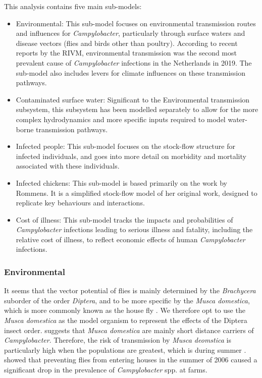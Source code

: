This analysis contains five main sub-models:
\begin{itemize}
    \item Environmental: This sub-model focuses on environmental transmission routes and influences for \textit{Campylobacter}, particularly through surface waters and disease vectors (flies and birds other than poultry). According to recent reports by the RIVM, environmental transmission was the second most prevalent cause of \textit{Campylobacter} infections in the Netherlands in 2019. The sub-model also includes levers for climate influences on these transmission pathways.
    \item Contaminated surface water: Significant to the Environmental transmission subsystem, this subsystem has been modelled separately to allow for the more complex hydrodynamics and more specific inputs required to model water-borne transmission pathways.
    \item Infected people: This sub-model focuses on the stock-flow structure for infected individuals, and goes into more detail on morbidity and mortality associated with these individuals.
    \item Infected chickens: This sub-model is based primarily on the work by Rommens. It is a simplified stock-flow model of her original work, designed to replicate key behaviours and interactions.
    \item Cost of illness: This sub-model tracks the impacts and probabilities of \textit{Campylobacter} infections leading to serious illness and fatality, including the relative cost of illness, to reflect economic effects of human \textit{Campylobacter} infections.

\end{itemize}

\subsubsection*{Environmental}
It seems that the vector potential of flies is mainly determined by the \textit{Brachycera} suborder of the order \textit{Diptera}, and to be more specific by the \textit{Musca domestica}, which is more commonly known as the house fly \parencite{hald_influxed_2008}. We therefore opt to use the \textit{Musca domestica} as the model organism to represent the effects of the Diptera insect order. \cite{skovgard_retention_2011} suggests that \textit{Musca domestica} are mainly short distance carriers of \textit{Campylobacter}. Therefore, the risk of transmission by \textit{Musca deomstica} is particularly high when the populations are greatest, which is during summer \parencite{royden_role_2016}. \cite{hald_use_2007} showed that preventing flies from entering houses in the summer of 2006 caused a significant drop in the prevalence of \textit{Campylobacter} spp. at farms.

